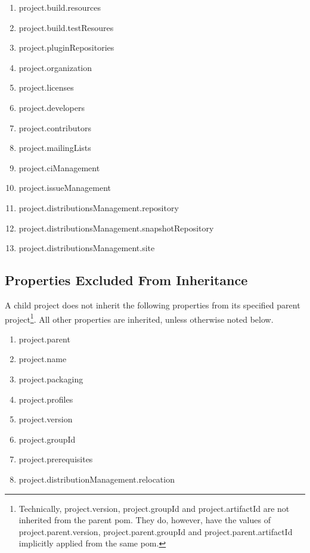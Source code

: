 \documentclass[12pt]{amsart}
\begin{document}
\begin{enumerate}
\item project.build.resources
\item project.build.testResoures
\item project.pluginRepositories 
\item project.organization 
\item project.licenses
\item project.developers
\item project.contributors
\item project.mailingLists
\item project.ciManagement
\item project.issueManagement
\item project.distributionsManagement.repository
\item project.distributionsManagement.snapshotRepository
\item project.distributionsManagement.site
\end{enumerate}

\subsection{Properties Excluded From Inheritance}
A child project does not inherit the following properties from its specified parent project\footnote{Technically, project.version, project.groupId and project.artifactId are not inherited from the parent pom. They do, however, have the values of project.parent.version, project.parent.groupId and project.parent.artifactId implicitly applied from the same pom.}. All other properties are inherited, unless otherwise noted below.
\begin{enumerate}
\item project.parent
\item project.name
\item project.packaging
\item project.profiles
\item project.version
\item project.groupId
\item project.prerequisites
\item project.distributionManagement.relocation
\end{enumerate}
\end{document}
